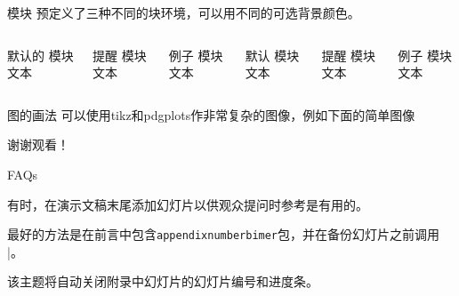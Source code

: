 \documentclass{kw-cn}
\begin{document}
\begin{frame}{模块}
	预定义了三种不同的块环境，可以用不同的可选背景颜色。
	
	\begin{columns}[T,onlytextwidth]
		\begin{block}{默认的}
			模块文本
		\end{block}
		
		\begin{alertblock}{提醒}
			模块文本
		\end{alertblock}
		
		\begin{exampleblock}{例子}
			模块文本
		\end{exampleblock}
		
		
		
		\begin{block}{默认}
			模块文本
		\end{block}
		
		\begin{alertblock}{提醒}
			模块文本
		\end{alertblock}
		
		\begin{exampleblock}{例子}
			模块文本
		\end{exampleblock}
		
	\end{columns}
\end{frame}
\begin{frame}{图的画法}
可以使用tikz和pdgplots作非常复杂的图像，例如下面的简单图像
	\begin{figure}
	\end{figure}
\end{frame}

\begin{frame}
	\Huge 谢谢观看！
\end{frame}


\appendix
\begin{frame}[fragile]{FAQs}

有时，在演示文稿末尾添加幻灯片以供观众提问时参考是有用的。
	
最好的方法是在前言中包含\verb|appendixnumberbimer|包，并在备份幻灯片之前调用\verb|| \appendix|。
	
该主题将自动关闭附录中幻灯片的幻灯片编号和进度条。

\end{frame}
\end{document}
